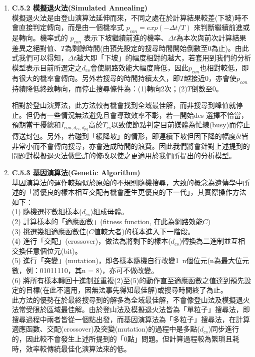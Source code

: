 \documentclass[12pt,a4paper]{article}
\begin{document}
\begin{description}
\begin{enumerate}
\item [\bf ]{\textbf{\Kai C.5.2 模擬退火法(Simulated Annealing)  }}\\

模擬退火法是由登山演算法延伸而來，不同之處在於計算結果較差(下坡)時不會直接判定轉向，而是由一個機率式 $p_{con} = exp (- \Delta t / T)$ 來判斷繼續前進或是轉向。機率式的 $p_{con}$ 表示下坡繼續前進的機率、$\Delta t$為本次與前次計算結果差異之絕對值、$T$為剩餘時間(由預先設定的搜尋時間開始倒數至0為止)。由此式我們可以得知，$\Delta t$越大即「下坡」的幅度相對的越大，若套用到我們的分析模型表示目前所選定之$d_{cs}$會使網路效能大幅度降低，因此$p_{con}$也相對較低，即有很大的機率會轉向。另外若搜尋的時間持續太久，即$T$越接近0，亦會使$p_{con}$持續降低終致轉向，而停止搜尋條件為：(1)轉向2次；(2)$T$倒數至0。

相對於登山演算法，此方法較有機會找到全域最佳解，而非搜尋到峰值就停止。但仍有一些情況無法避免且會導致效率不彰，若一開始dcs 選擇不恰當，預期當干擾總和$I_{con,d_{cs},d_{pg}}$高於$T_{cs}$以致使節點判定目前媒體為忙線(busy)而停止傳送封包。另外，若碰到「緩降坡」的情形，即連續下坡但因下降的幅度$\delta t$皆非常小而不會轉向搜尋，亦會造成時間的浪費。因此我們將會針對上述提到的問題對模擬退火法做些許的修改以使之更適用於我們所提出的分析模型。\\


\item [\bf ]{\textbf{\Kai C.5.3 基因演算法(Genetic Algorithm)  }}\\

基因演算法的運作較類似於原始的不規則隨機搜尋，大致的概念為遺傳學中所述的「將優良的樣本相互交配有機會產生更優良的下一代」，其實際操作方法如下：\\
(1) 隨機選擇數組樣本($d_{cs}$)組成母體。\\
(2) 計算樣本的「適應函數」(fitness function, 在此為網路效能$C$)\\
(3) 挑選幾組適應函數佳($C$值較大者)的樣本進入下一階段。\\
(4) 進行「交配」(crossover)，做法為將剩下的樣本($d_{cs}$)轉換為二進制並互相交換任意個位元(bit)。\\
(5) 進行「突變」(mutation)，即各樣本隨機自行改變1~n個位元(n為最大位元數，例：01011110，其n = 8)，亦可不做改變。\\
(6) 將所有樣本轉回十進制並重複(2)至(5)的動作直至適應函數之值達到預先設定的目標(在此不適用，因無法事先得知最佳解)或搜尋時間終了為止。\\

此方法的優勢在於最終搜尋到的解多為全域最佳解，不會像登山法及模擬退火法常受限於區域最佳解。由於登山法及模擬退火法皆為「單粒子」搜尋法，即搜尋過程中兩者皆從一個點出發，而基因演算法為「多粒子」搜尋法，在計算適應函數、交配(crossover)及突變(mutation)的過程中是多點($d_{cs}$)同步進行的，因此較不會發生上述所提到的「0點」問題。但計算過程較為繁瑣且耗時，效率較傳統最佳化演算法來的低。\\



\end{enumerate}
\end{description}
\end{document}
